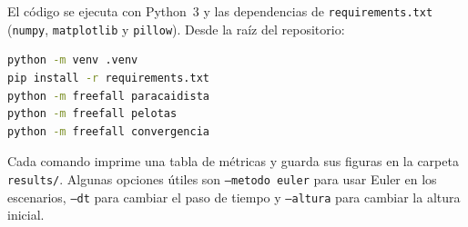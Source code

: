 El código se ejecuta con Python~3 y las dependencias de \texttt{requirements.txt} (\texttt{numpy}, \texttt{matplotlib} y \texttt{pillow}). Desde la raíz del repositorio:

\begin{lstlisting}[language=bash]
python -m venv .venv
pip install -r requirements.txt
python -m freefall paracaidista
python -m freefall pelotas
python -m freefall convergencia
\end{lstlisting}

Cada comando imprime una tabla de métricas y guarda sus figuras en la carpeta \texttt{results/}. Algunas opciones útiles son \texttt{--metodo euler} para usar Euler en los escenarios, \texttt{--dt} para cambiar el paso de tiempo y \texttt{--altura} para cambiar la altura inicial.
